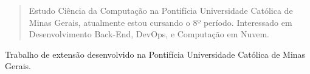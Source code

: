 \documentclass[10pt,a4paper,ragged2e,withhyper]{altacv}
\begin{document}
\begin{paracol}{2}

        
        
        
        
        
        \newpage
        
        \switchcolumn
        
            \begin{quote}
                Estudo Ciência da Computação na Pontifícia Universidade Católica de Minas Gerais, atualmente estou cursando o 8º período. Interessado em Desenvolvimento Back-End, DevOps, e Computação em Nuvem.
            \end{quote}
        
            Trabalho de extensão desenvolvido na Pontifícia Universidade Católica de Minas Gerais.


\end{paracol}
\end{document}
